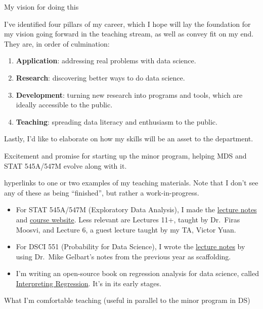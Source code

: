 \documentclass[]{article}
\providecommand{\tightlist}{%
  \setlength{\itemsep}{0pt}\setlength{\parskip}{0pt}}
\begin{document}
My vision for doing this

I've identified four pillars of my career, which I hope will lay the foundation for my vision going forward in the teaching stream, as well as convey fit on my end. They are, in order of culmination:

\begin{enumerate}
\def\labelenumi{\arabic{enumi}.}
\tightlist
\item
  \textbf{Application}: addressing real problems with data science.
\item
  \textbf{Research}: discovering better ways to do data science.
\item
  \textbf{Development}: turning new research into programs and tools, which are ideally accessible to the public.
\item
  \textbf{Teaching}: spreading data literacy and enthusiasm to the public.
\end{enumerate}

Lastly, I'd like to elaborate on how my skills will be an asset to the department.

Excitement and promise for starting up the minor program, helping MDS and STAT 545A/547M evolve along with it.

hyperlinks to one or two examples of my teaching materials. Note that I don't see any of these as being ``finished'', but rather a work-in-progress.

\begin{itemize}
\tightlist
\item
  For STAT 545A/547M (Exploratory Data Analysis), I made the \href{https://stat545guidebook.netlify.com/}{lecture notes} and \href{https://stat545.stat.ubc.ca/}{course website}. Less relevant are Lectures 11+, taught by Dr.~Firas Moosvi, and Lecture 6, a guest lecture taught by my TA, Victor Yuan.
\item
  For DSCI 551 (Probability for Data Science), I wrote the \href{https://ubc-mds.github.io/DSCI_551_stat-prob-dsci/lectures/}{lecture notes} by using Dr.~Mike Gelbart's notes from the previous year as scaffolding.
\item
  I'm writing an open-source book on regression analysis for data science, called \href{https://interpreting-regression.netlify.com/}{Interpreting Regression}. It's in its early stages.
\end{itemize}

What I'm comfortable teaching (useful in parallel to the minor program in DS)
\end{document}
